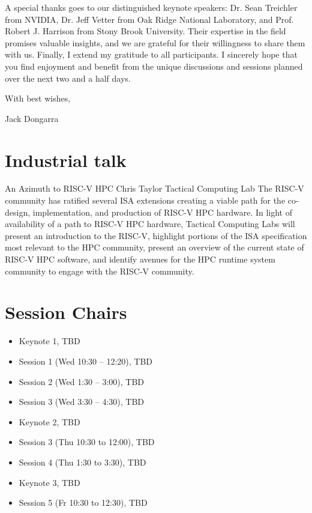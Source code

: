\documentclass[12pt,letterpaper]{book}
\newenvironment{conf-abstract}[4][]{
 \needspace{10\baselineskip}
 \begin{center}
 { \renewcommand\textsuperscript[1]{}
 \phantomsection\addcontentsline{toc}{section}
 {\texorpdfstring{#2 (\emph{#3})}{#2 (#3)}}
 }
 {{\large\bfseries #2}\marginnote{#1}\par}
 \medskip
 {#3\par}
 \smallskip
 {\small #4\par}
 \end{center}
}{%
 \bigskip
 \hrule
 \bigskip
}
\begin{document}
\noindent A special thanks goes to our distinguished keynote speakers: Dr. Sean
Treichler from NVIDIA, Dr. Jeff Vetter from Oak Ridge National
Laboratory, and Prof. Robert J. Harrison from Stony Brook University.
Their expertise in the field promises valuable insights, and we are
grateful for their willingness to share them with us. Finally, I extend
my gratitude to all participants. I sincerely hope that you find
enjoyment and benefit from the unique discussions and sessions planned
over the next two and a half days.

\noindent With best wishes,

Jack Dongarra


%

\newpage



\tableofcontents

\mainmatter

\chapter{Industrial talk}

\begin{conf-abstract}[16$^{th}$]
{An Azimuth to RISC-V HPC}
{Chris Taylor}
{Tactical Computing Lab}
The RISC-V community has ratified several ISA extensions creating a viable path for the co-design, implementation, and production of RISC-V HPC hardware. In light of availability of a path to RISC-V HPC hardware, Tactical Computing Labs will present an introduction to the RISC-V, highlight portions of the ISA specification most relevant to the HPC community, present an overview of the current state of RISC-V HPC software,  and identify avenues for the HPC runtime system community to engage with the RISC-V community.
\end{conf-abstract}

\chapter{Session Chairs}

\begin{itemize}
\item Keynote 1, TBD
\item Session 1 (Wed 10:30 -- 12:20), TBD
\item Session 2 (Wed 1:30 -- 3:00), TBD
\item Session 3 (Wed 3:30 -- 4:30), TBD
\item Keynote 2, TBD
\item Session 3 (Thu 10:30 to 12:00), TBD
\item Session 4 (Thu 1:30 to 3:30), TBD
\item Keynote 3, TBD
\item Session 5 (Fr 10:30 to 12:30), TBD
\end{itemize}
\end{document}
